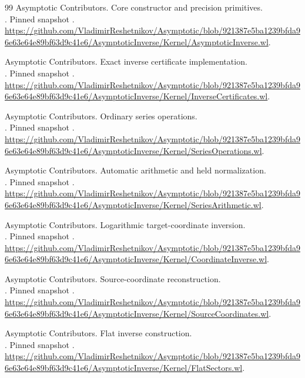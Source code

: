 \begin{thebibliography}{99}
 Asymptotic Contributors. Core constructor and precision primitives.\\
. Pinned snapshot . \url{https://github.com/VladimirReshetnikov/Asymptotic/blob/921387e5ba1239bfda96e63e64e89bf63d9c41e6/AsymptoticInverse/Kernel/AsymptoticInverse.wl}.

 Asymptotic Contributors. Exact inverse certificate implementation.\\
. Pinned snapshot . \url{https://github.com/VladimirReshetnikov/Asymptotic/blob/921387e5ba1239bfda96e63e64e89bf63d9c41e6/AsymptoticInverse/Kernel/InverseCertificates.wl}.

 Asymptotic Contributors. Ordinary series operations.\\
. Pinned snapshot . \url{https://github.com/VladimirReshetnikov/Asymptotic/blob/921387e5ba1239bfda96e63e64e89bf63d9c41e6/AsymptoticInverse/Kernel/SeriesOperations.wl}.

 Asymptotic Contributors. Automatic arithmetic and held normalization.\\
. Pinned snapshot . \url{https://github.com/VladimirReshetnikov/Asymptotic/blob/921387e5ba1239bfda96e63e64e89bf63d9c41e6/AsymptoticInverse/Kernel/SeriesArithmetic.wl}.

 Asymptotic Contributors. Logarithmic target-coordinate inversion.\\
. Pinned snapshot . \url{https://github.com/VladimirReshetnikov/Asymptotic/blob/921387e5ba1239bfda96e63e64e89bf63d9c41e6/AsymptoticInverse/Kernel/CoordinateInverse.wl}.

 Asymptotic Contributors. Source-coordinate reconstruction.\\
. Pinned snapshot . \url{https://github.com/VladimirReshetnikov/Asymptotic/blob/921387e5ba1239bfda96e63e64e89bf63d9c41e6/AsymptoticInverse/Kernel/SourceCoordinates.wl}.

 Asymptotic Contributors. Flat inverse construction.\\
. Pinned snapshot . \url{https://github.com/VladimirReshetnikov/Asymptotic/blob/921387e5ba1239bfda96e63e64e89bf63d9c41e6/AsymptoticInverse/Kernel/FlatSectors.wl}.


\end{thebibliography}
